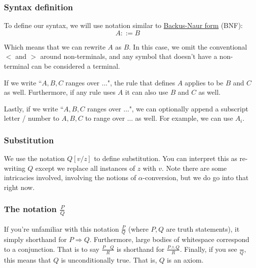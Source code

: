 \subsubsection{Syntax definition}
To define our syntax, we will use notation similar to \href{https://en.wikipedia.org/wiki/Backus\%E2\%80\%93Naur_form}{Backus-Naur form} (BNF):
$$
A ::= B
$$

Which means that we can rewrite $A$ as $B$. In this case, we omit the conventional $<$ and $>$ around non-terminals, and any symbol that doesn't have a non-terminal can be considered a terminal.

If we write ``$A,B,C$ ranges over $\dots$", the rule that defines $A$ applies to be $B$ and $C$ as well. Furthermore, if any rule uses $A$ it can also use $B$ and $C$ as well.

Lastly, if we write ``$A,B,C$ ranges over $\dots$", we can optionally append a subscript letter / number to $A,B,C$ to range over $\dots$ as well. For example, we can use $A_i$.

\subsubsection{Substitution}
We use the notation $Q[v/z]$ to define substitution. You can interpret this as re-writing $Q$ except we replace all instances of $z$ with $v$. Note there are some intricacies involved, involving the notions of $\alpha$-conversion, but we do go into that right now.

\subsubsection{The notation $\frac{P}{Q}$}
If you're unfamiliar with this notation $\frac{P}{Q}$ (where $P,Q$ are truth statements), it simply shorthand for $P \Rightarrow Q$. Furthermore, large bodies of whitespace correspond to a conjunction. That is to say $\frac{P \quad Q}{R}$ is shorthand for $\frac{P \land Q}{R}$. Finally, if you see $\frac{}{Q}$, this means that $Q$ is unconditionally true. That is, $Q$ is an axiom.